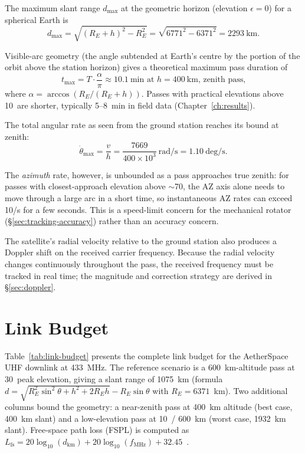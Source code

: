 The maximum slant range $d_{\max}$ at the geometric horizon (elevation $\epsilon = 0$\degree) for a spherical Earth is
\begin{equation}
    d_{\max} = \sqrt{(R_E+h)^2 - R_E^2} = \sqrt{6771^2 - 6371^2} = 2293~\text{km}.
\end{equation}

Visible-arc geometry (the angle subtended at Earth's centre by the portion of the orbit above the station horizon) gives a theoretical maximum pass duration of
\begin{equation}
    t_{\max} = T \cdot \frac{\alpha}{\pi} \approx 10.1~\text{min at } h = 400~\text{km, zenith pass,}
\end{equation}
where $\alpha = \arccos(R_E / (R_E + h))$. Passes with practical elevations above 10\degree\ are shorter, typically 5--8~min in field data (Chapter~\ref{ch:results}).

The total angular rate as seen from the ground station reaches its bound at zenith:
\begin{equation}
    \dot{\theta}_{\max} = \frac{v}{h} = \frac{7669}{400 \times 10^3}~\text{rad/s} = 1.10~\text{deg/s}.
\end{equation}

The \textit{azimuth} rate, however, is unbounded as a pass approaches true zenith: for passes with closest-approach elevation above $\sim$70\degree, the AZ axis alone needs to move through a large arc in a short time, so instantaneous AZ rates can exceed 10\degree/s for a few seconds. This is a speed-limit concern for the mechanical rotator (\S\ref{sec:tracking-accuracy}) rather than an accuracy concern.

The satellite's radial velocity relative to the ground station also produces a Doppler shift on the received carrier frequency. Because the radial velocity changes continuously throughout the pass, the received frequency must be tracked in real time; the magnitude and correction strategy are derived in \S\ref{sec:doppler}.

\section{Link Budget}
\label{sec:link-budget}

Table~\ref{tab:link-budget} presents the complete link budget for the AetherSpace UHF downlink at 433~MHz. The reference scenario is a 600~km-altitude pass at 30\degree\ peak elevation, giving a slant range of 1075~km (formula $d = \sqrt{R_E^2 \sin^2\theta + h^2 + 2 R_E h} - R_E \sin\theta$ with $R_E = 6371$~km). Two additional columns bound the geometry: a near-zenith pass at 400~km altitude (best case, 400~km slant) and a low-elevation pass at 10\degree\ / 600~km (worst case, 1932~km slant). Free-space path loss (FSPL) is computed as $L_\text{fs} = 20\log_{10}(d_\text{km}) + 20\log_{10}(f_\text{MHz}) + 32.45$~\cite{friis1946transmission,roddy2006satellite}.

